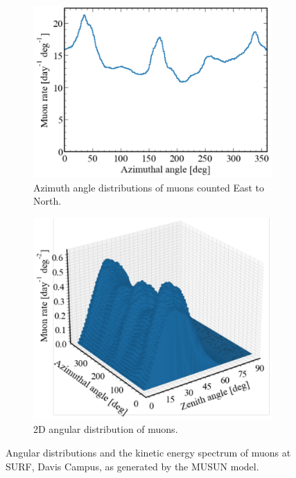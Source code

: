 \begin{figure}[htbp]
\begin{subfigure}[b]{0.49\textwidth}
        \centering 
        \includegraphics[width=\textwidth]{figures/Muons/Azimuthal.pdf}
        \caption{Azimuth angle distributions of muons counted East to North.}
        \label{fig:azi}
    \end{subfigure}
    \begin{subfigure}[b]{0.49\textwidth}   
        \centering 
        \includegraphics[width=\textwidth]{figures/Muons/azi_vs_zen_finalLZstyle.pdf}
        \caption{2D angular distribution of muons.} 
        \label{Azi_vs_Zen}
    \end{subfigure}
    \caption{Angular distributions and the kinetic energy spectrum of muons at SURF, Davis Campus, as generated by the MUSUN model.} 
    \label{Prime_info}
\end{figure}
